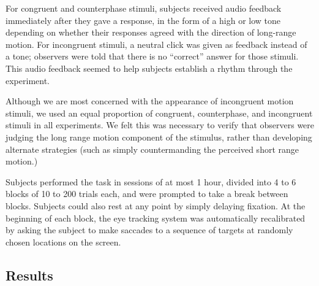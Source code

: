 \documentclass[english,jou]{article}
\begin{document}
For congruent and counterphase stimuli, subjects received audio feedback
immediately after they gave a response, in the form of a high or low
tone depending on whether their responses agreed with the direction
of long-range motion. For incongruent stimuli, a neutral click was
given as feedback instead of a tone; observers were told that there
is no ``correct'' answer for those stimuli. This audio feedback
seemed to help subjects establish a rhythm through the experiment. 

Although we are most concerned with the appearance of incongruent
motion stimuli, we used an equal proportion of congruent, counterphase,
and incongruent stimuli in all experiments. We felt this was necessary
to verify that observers were judging the long range motion component
of the stimulus, rather than developing alternate strategies (such
as simply countermanding the perceived short range motion.) 



Subjects performed the task in sessions of at most 1 hour, divided
into 4 to 6 blocks of 10 to 200 trials each, and were prompted to
take a break between blocks. Subjects could also rest at any point
by simply delaying fixation. At the beginning of each block, the eye
tracking system was automatically recalibrated by asking the subject
to make saccades to a sequence of targets at randomly chosen locations
on the screen.


\subsection{Results}
\end{document}
